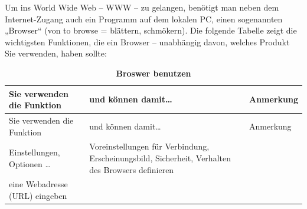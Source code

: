 \documentclass[]{book}
\theoremstyle{definition}
\theoremstyle{definition}
\theoremstyle{definition}
\theoremstyle{remark}
\begin{document}
Um ins World Wide Web -- WWW -- zu gelangen, benötigt man neben dem
Internet-Zugang auch ein Programm auf dem lokalen PC, einen sogenannten
„Browser`` (von to browse = blättern, schmökern). Die folgende Tabelle
zeigt die wichtigsten Funktionen, die ein Browser -- unabhängig davon,
welches Produkt Sie verwenden, haben sollte:

\begin{longtable}[]{@{}lll@{}}
\caption{\textbf{\label{tab:browser-benutzen} Broswer
benutzen}}\tabularnewline
\toprule
\begin{minipage}[b]{0.31\columnwidth}\raggedright\strut
Sie verwenden die Funktion\strut
\end{minipage} & \begin{minipage}[b]{0.27\columnwidth}\raggedright\strut
und können damit\ldots{}\strut
\end{minipage} & \begin{minipage}[b]{0.33\columnwidth}\raggedright\strut
Anmerkung\strut
\end{minipage}\tabularnewline
\midrule
\endfirsthead
\toprule
\begin{minipage}[b]{0.31\columnwidth}\raggedright\strut
Sie verwenden die Funktion\strut
\end{minipage} & \begin{minipage}[b]{0.27\columnwidth}\raggedright\strut
und können damit\ldots{}\strut
\end{minipage} & \begin{minipage}[b]{0.33\columnwidth}\raggedright\strut
Anmerkung\strut
\end{minipage}\tabularnewline
\midrule
\endhead
\begin{minipage}[t]{0.31\columnwidth}\raggedright\strut
Einstellungen, Optionen \ldots{} \vspace{5mm}\strut
\end{minipage} & \begin{minipage}[t]{0.27\columnwidth}\raggedright\strut
Voreinstellungen für Verbindung, Erscheinungsbild, Sicherheit, Verhalten
des Browsers definieren \vspace{5mm}\strut
\end{minipage} & \begin{minipage}[t]{0.33\columnwidth}\raggedright\strut
\strut
\end{minipage}\tabularnewline
\begin{minipage}[t]{0.31\columnwidth}\raggedright\strut
eine Webadresse (URL) eingeben \vspace{5mm}\strut
\end{minipage} & \begin{minipage}[t]{0.27\columnwidth}\raggedright\strut

\end{minipage}
\end{longtable}
\end{document}
